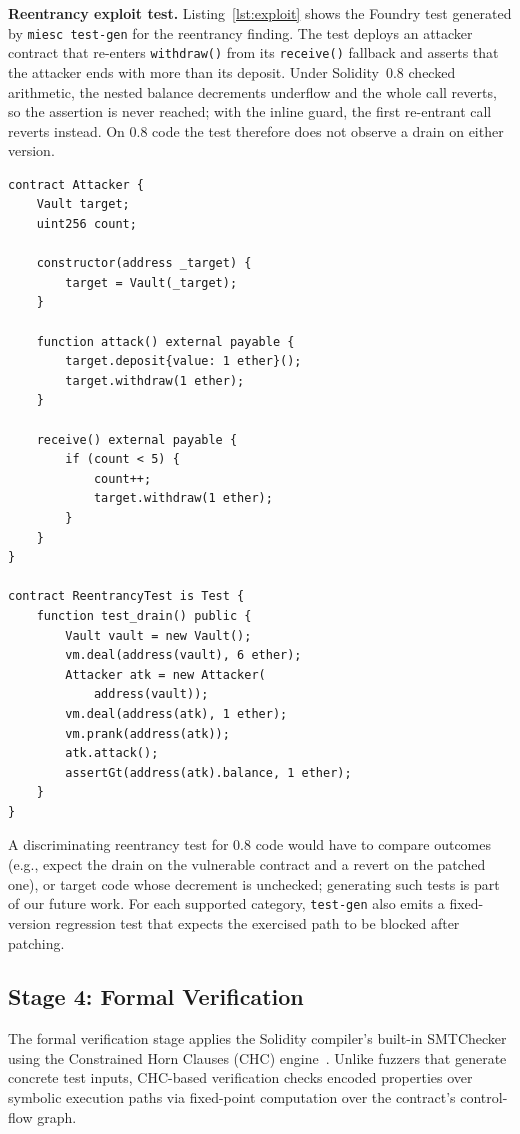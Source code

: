 \documentclass[conference]{IEEEtran}
\begin{document}
\textbf{Reentrancy exploit test.} Listing~\ref{lst:exploit} shows the Foundry test generated by \texttt{miesc test-gen} for the reentrancy finding. The test deploys an attacker contract that re-enters \texttt{withdraw()} from its \texttt{receive()} fallback and asserts that the attacker ends with more than its deposit. Under Solidity~0.8 checked arithmetic, the nested balance decrements underflow and the whole call reverts, so the assertion is never reached; with the inline guard, the first re-entrant call reverts instead. On 0.8 code the test therefore does not observe a drain on either version.

\begin{lstlisting}[caption={Generated exploit test for reentrancy (simplified)},label={lst:exploit},float=htbp]
contract Attacker {
    Vault target;
    uint256 count;

    constructor(address _target) {
        target = Vault(_target);
    }

    function attack() external payable {
        target.deposit{value: 1 ether}();
        target.withdraw(1 ether);
    }

    receive() external payable {
        if (count < 5) {
            count++;
            target.withdraw(1 ether);
        }
    }
}

contract ReentrancyTest is Test {
    function test_drain() public {
        Vault vault = new Vault();
        vm.deal(address(vault), 6 ether);
        Attacker atk = new Attacker(
            address(vault));
        vm.deal(address(atk), 1 ether);
        vm.prank(address(atk));
        atk.attack();
        assertGt(address(atk).balance, 1 ether);
    }
}
\end{lstlisting}

A discriminating reentrancy test for 0.8 code would have to compare outcomes (e.g., expect the drain on the vulnerable contract and a revert on the patched one), or target code whose decrement is unchecked; generating such tests is part of our future work. For each supported category, \texttt{test-gen} also emits a fixed-version regression test that expects the exercised path to be blocked after patching.

\subsection{Stage 4: Formal Verification}

The formal verification stage applies the Solidity compiler's built-in SMTChecker using the Constrained Horn Clauses (CHC) engine~\cite{solidity_smtchecker}. Unlike fuzzers that generate concrete test inputs, CHC-based verification checks encoded properties over symbolic execution paths via fixed-point computation over the contract's control-flow graph.
\end{document}
